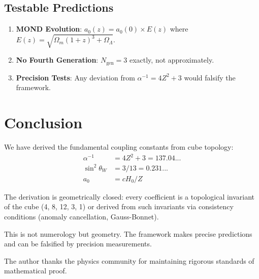 \documentclass[twocolumn,showpacs,preprintnumbers,amsmath,amssymb,prd]{revtex4-2}
\begin{document}
\subsection{Testable Predictions}

\begin{enumerate}
\item \textbf{MOND Evolution}: $a_0(z) = a_0(0) \times E(z)$ where $E(z) = \sqrt{\Omega_m(1+z)^3 + \Omega_\Lambda}$.
\item \textbf{No Fourth Generation}: $N_{\text{gen}} = 3$ exactly, not approximately.
\item \textbf{Precision Tests}: Any deviation from $\alpha^{-1} = 4Z^2 + 3$ would falsify the framework.
\end{enumerate}

\section{Conclusion}

We have derived the fundamental coupling constants from cube topology:
\begin{align}
\alpha^{-1} &= 4Z^2 + 3 = 137.04... \nonumber\\
\sin^2\theta_W &= 3/13 = 0.231... \nonumber\\
a_0 &= cH_0/Z
\end{align}

The derivation is geometrically closed: every coefficient is a topological invariant of the cube (4, 8, 12, 3, 1) or derived from such invariants via consistency conditions (anomaly cancellation, Gauss-Bonnet).

This is not numerology but geometry. The framework makes precise predictions and can be falsified by precision measurements.

\begin{acknowledgments}
The author thanks the physics community for maintaining rigorous standards of mathematical proof.
\end{acknowledgments}
\end{document}
